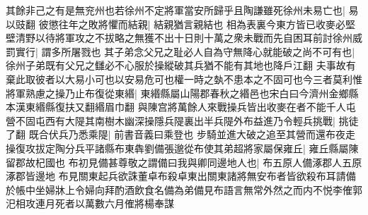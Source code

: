 其餘非己之有是無兖州也若徐州不定將軍當安所歸乎且陶謙雖死徐州未易亡也|{
	易以豉翻}
彼懲往年之敗將懼而結親|{
	結親猶言親結也}
相為表裏今東方皆已收麥必堅壁清野以待將軍攻之不拔略之無獲不出十日則十萬之衆未戰而先自困耳前討徐州威罰實行|{
	謂多所屠戮也}
其子弟念父兄之耻必人自為守無降心就能破之尚不可有也|{
	徐州子弟既有父兄之讎必不心服於操縱破其兵猶不能有其地也降戶江翻}
夫事故有棄此取彼者以大易小可也以安易危可也權一時之埶不患本之不固可也今三者莫利惟將軍熟慮之操乃止布復從東緡|{
	東緡縣屬山陽郡春秋之緡邑也宋白曰今濟州金鄉縣本漢東緡縣復扶又翻緡眉巾翻}
與陳宫將萬餘人來戰操兵皆出收麥在者不能千人屯營不固屯西有大隄其南樹木幽深操隱兵隄裏出半兵隄外布益進乃令輕兵挑戰|{
	挑徒了翻}
既合伏兵乃悉乘隄|{
	前書音義曰乘登也}
步騎並進大破之追至其營而還布夜走操復攻拔定陶分兵平諸縣布東犇劉備張邈從布使其弟超將家屬保雍丘|{
	雍丘縣屬陳留郡故杞國也}
布初見備甚尊敬之謂備曰我與卿同邊地人也|{
	布五原人備涿郡人五原涿郡皆邊地}
布見關東起兵欲誅董卓布殺卓東出關東諸將無安布者皆欲殺布耳請備於帳中坐婦牀上令婦向拜酌酒飲食名備為弟備見布語言無常外然之而内不悦李傕郭汜相攻連月死者以萬數六月傕將楊奉謀


